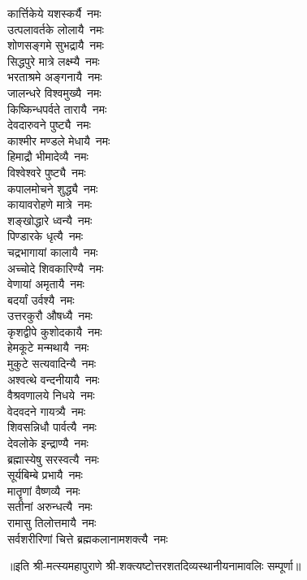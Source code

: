 \begin{multicols}{2}
\begin{flushleft}
कार्त्तिकेये यशस्कर्यै~नमः\\
उत्पलावर्तके लोलायै~नमः\\
शोणसङ्गमे सुभद्रायै~नमः\\
सिद्धपुरे मात्रे लक्ष्म्यै~नमः\\
भरताश्रमे अङ्गनायै~नमः\\
जालन्धरे विश्वमुख्यै~नमः\hfill{}\\
किष्किन्धपर्वते तारायै~नमः\\
देवदारुवने पुष्ट्यै~नमः\\
काश्मीर मण्डले मेधायै~नमः\\
हिमाद्रौ भीमादेव्यै~नमः\\
विश्वेश्वरे पुष्ट्यै~नमः\\
कपालमोचने शुद्ध्यै~नमः\\
कायावरोहणे मात्रे~नमः\\
शङ्खोद्धारे ध्वन्यै~नमः\\
पिण्डारके धृत्यै~नमः\\
चद्रभागायां कालायै~नमः\hfill{}\\
अच्चोदे शिवकारिण्यै~नमः\\
वेणायां अमृतायै~नमः\\
बदर्यां उर्वश्यै~नमः\\
उत्तरकुरौ औषध्यै~नमः\\
कृशद्वीपे कुशोदकायै~नमः\\
हेमकूटे मन्मथायै~नमः\\
मुकुटे सत्यवादिन्यै~नमः\\
अश्वत्थे वन्दनीयायै~नमः\\
वैश्रवणालये निधये~नमः\\
वेदवदने गायत्र्यै~नमः\hfill{}\\
शिवसन्निधौ पार्वत्यै~नमः\\
देवलोके इन्द्राण्यै~नमः\\
ब्रह्मास्येषु सरस्वत्यै~नमः\\
सूर्यबिम्बे प्रभायै~नमः\\
मातॄणां वैष्णव्यै~नमः\\
सतीनां अरुन्धत्यै~नमः\\
रामासु तिलोत्तमायै~नमः\\
सर्वशरीरिणां चित्ते ब्रह्मकलानामशक्त्यै~नमः\\
\end{flushleft}
\end{multicols}
॥इति श्री-मत्स्यमहापुराणे श्री-शक्त्यष्टोत्तर\-शतदिव्यस्थानीयनामावलिः सम्पूर्णा॥
